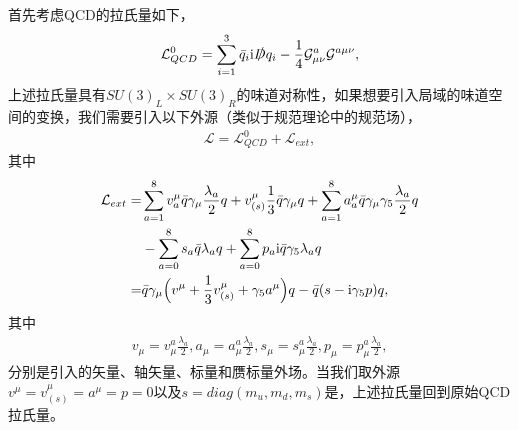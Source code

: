 \documentclass[aps,tightenlines,16pt]{ctexart}
\numberwithin{equation}{section}
\newcommand{\mL}{\mathcal{L}}
\begin{document}
首先考虑QCD的拉氏量如下，
\begin{align}
   \mL_{QCD}^0=\sum_{i=1}^{3}\bar{q}_i \mbox{i} \slashed{D} q_i-\frac{1}{4}\mathcal{G}_{\mu \nu}^a \mathcal{G}^{a \mu \nu},
\end{align}
上述拉氏量具有$SU(3)_L\times SU(3)_R$的味道对称性，如果想要引入局域的味道空间的变换，我们需要引入以下外源（类似于规范理论中的规范场）\cite{GASSER1984142}\cite{GASSER1985465}，
\begin{align}
   \mL = \mL_{QCD}^0 + \mL_{ext},
\end{align}
其中
\begin{align}
   \begin{aligned}
   \mL_{ext} =& \sum_{a=1}^8 v_a^{\mu} \bar{q} \gamma_{\mu}\frac{\lambda_a}{2}q + v_{(s)}^{\mu}\frac{1}{3}\bar{q}\gamma_{\mu}q + \sum_{a=1}^8 a_{a}^{\mu} \bar{q} \gamma_{\mu} \gamma_5 \frac{\lambda_a}{2}q\\
   &-\sum_{a=0}^{8}s_{a}\bar{q}\lambda_{a}q + \sum_{a=0}^{8}p_{a}\mbox{i}\bar{q}\gamma_5 \lambda_a q\\
   =&\bar{q}\gamma_{\mu}\Bigl(v^{\mu}+\frac{1}{3}v_{(s)}^{\mu}+\gamma_5 a^{\mu}\Bigr)q -\bar{q}(s-\mbox{i}\gamma_5 p)q,
   \end{aligned}
\end{align}
其中
\begin{align}
   v_{\mu} = v_{\mu}^a\frac{\lambda_a}{2},a_{\mu} = a_{\mu}^a\frac{\lambda_a}{2},s_{\mu} = s_{\mu}^a\frac{\lambda_a}{2},p_{\mu} = p_{\mu}^a\frac{\lambda_a}{2},
\end{align}
分别是引入的矢量、轴矢量、标量和赝标量外场。当我们取外源$v^{\mu}=v_{(s)}^{\mu}=a^{\mu}=p=0$以及$s=diag(m_u,m_d,m_s)$是，上述拉氏量回到原始QCD拉氏量。
\end{document}
